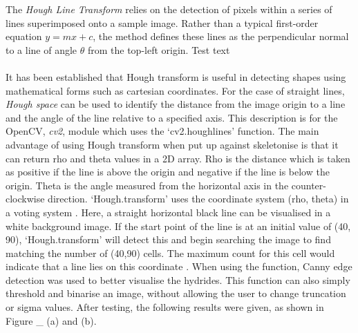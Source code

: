 \documentclass{article}
\begin{document}
	The \textit{Hough Line Transform} relies on the detection of pixels within a series of lines superimposed onto a sample image. Rather than a typical first-order equation $y=mx+c$, the method defines these lines as the perpendicular normal to a line of angle $\theta$ from the top-left origin. Test text
	\\
	\\	
	It has been established that Hough transform is useful in detecting shapes using mathematical forms such as cartesian coordinates. For the case of straight lines, \textit{Hough space} can be used to identify the distance from the image origin to a line and the angle of the line relative to a specified axis. This description is for the OpenCV, \textit{cv2}, module which uses the ‘cv2.houghlines’ function. The main advantage of using Hough transform when put up against skeletonise is that it can return rho and theta values in a 2D array. Rho is the distance which is taken as positive if the line is above the origin and negative if the line is below the origin. Theta is the angle measured from the horizontal axis in the counter-clockwise direction. ‘Hough.transform’ uses the coordinate system (rho, theta) in a voting system \cite{OpenCV2013}. Here, a straight horizontal black line can be visualised in a white background image. If the start point of the line is at an initial value of (40, 90), ‘Hough.transform’ will detect this and begin searching the image to find matching the number of (40,90) cells. The maximum count for this cell would indicate that a line lies on this coordinate \cite{OpenCV2013}. When using the function, Canny edge detection was used to better visualise the hydrides. This function can also simply threshold and binarise an image, without allowing the user to change truncation or sigma values. After testing, the following results were given, as shown in Figure \_ (a) and (b). 
	\\	
\end{document}
